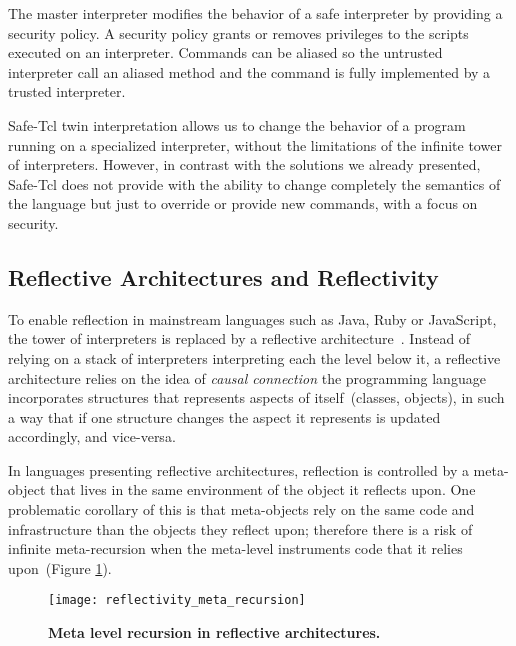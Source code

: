 The master interpreter modifies the behavior of a safe interpreter by providing a security policy. A security policy grants or removes privileges to the scripts executed on an interpreter. Commands can be aliased so the untrusted interpreter call an aliased method and the command is fully implemented by a trusted interpreter.

Safe-Tcl twin interpretation allows us to change the behavior of a program running on a specialized interpreter, without the limitations of the infinite tower of interpreters. However, in contrast with the solutions we already presented, Safe-Tcl does not provide with the ability to change completely the semantics of the language but just to override or provide new commands, with a focus on security.

\subsection*{Reflective Architectures and Reflectivity}

To enable reflection in mainstream languages such as Java, Ruby or JavaScript, the tower of interpreters is replaced by a reflective architecture~\cite{Maes87a}. Instead of relying on a stack of interpreters interpreting each the level below it, a reflective architecture relies on the idea of \emph{causal connection} \ie the programming language incorporates structures that represents aspects of itself~(\eg classes, objects), in such a way that if one structure changes the aspect it represents is updated accordingly, and vice-versa.


In languages presenting reflective architectures, reflection is controlled by a meta-object that lives in the same environment of the object it reflects upon.
One problematic corollary of this is that meta-objects rely on the same code and infrastructure than the objects they reflect upon; therefore there is a risk of infinite meta-recursion when the meta-level instruments code that it relies upon~(Figure \ref{fig:reflectivity_meta_recursion}).

\begin{figure}[ht]
\begin{center}
\texttt{[image: reflectivity\_meta\_recursion]}
\caption{\textbf{Meta level recursion in reflective architectures.}\label{fig:reflectivity_meta_recursion}
 }
\end{center}
\end{figure}

